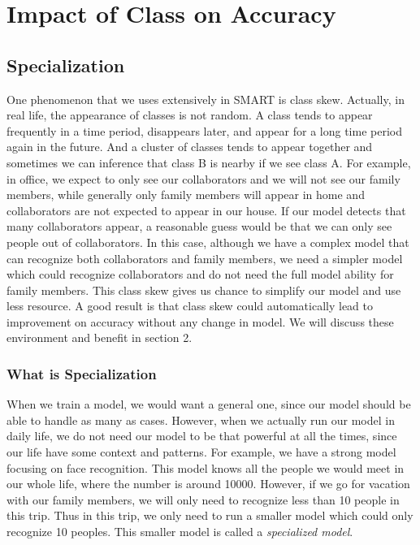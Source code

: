 \documentclass{article}
\begin{document}
\section{Impact of Class on Accuracy}


\subsection{Specialization}

One phenomenon that we uses extensively in SMART is class skew. Actually, in real life, the appearance of classes is not random. A class tends to appear frequently in a time period, disappears later, and appear for a long time period again in the future. And a cluster of classes tends to appear together and sometimes we can inference that class B is nearby if we see class A. For example, in office, we expect to only see our collaborators and we will not see our family members, while generally only family members will appear in home and collaborators are not expected to appear in our house. If our model detects that many collaborators appear, a reasonable guess would be that we can only see people out of collaborators. In this case, although we have a complex model that can recognize both collaborators and family members, we need a simpler model which could recognize collaborators and do not need the full model ability for family members. This class skew gives us chance to simplify our model and use less resource. A good result is that class skew could automatically lead to improvement on accuracy without any change in model. We will discuss these environment and benefit in section 2. 


\subsubsection{What is Specialization}
When we train a model, we would want a general one, since our model should be able to handle as many as cases. However, when we actually run our model in daily life, we do not need our model to be that powerful at all the times, since our life have some context and patterns. For example, we have a strong model focusing on face recognition. This model knows all the people we would meet in our whole life, where the number is around 10000. However, if we go for vacation with our family members, we will only need to recognize less than 10 people in this trip. Thus in this trip, we only need to run a smaller model which could only recognize 10 peoples. This smaller model is called a \textit{specialized model}.
\end{document}

